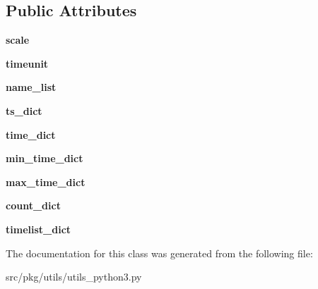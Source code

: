 \subsection*{Public Attributes}
\begin{DoxyCompactItemize}
\item 
\mbox{\label{classrnb-planning_1_1src_1_1pkg_1_1utils_1_1utils__python3_1_1_global_timer_a4f6a8a3fa0f9b2e31e3b1055d60afb4d}} 
{\bfseries scale}
\item 
\mbox{\label{classrnb-planning_1_1src_1_1pkg_1_1utils_1_1utils__python3_1_1_global_timer_af40f7c1aeea5c43d800028ba79819d70}} 
{\bfseries timeunit}
\item 
\mbox{\label{classrnb-planning_1_1src_1_1pkg_1_1utils_1_1utils__python3_1_1_global_timer_a430bc0959a9a9a6ff9e13a1a423c6fda}} 
{\bfseries name\+\_\+list}
\item 
\mbox{\label{classrnb-planning_1_1src_1_1pkg_1_1utils_1_1utils__python3_1_1_global_timer_a87d86cd0930b5243b00adfd9d4e30a11}} 
{\bfseries ts\+\_\+dict}
\item 
\mbox{\label{classrnb-planning_1_1src_1_1pkg_1_1utils_1_1utils__python3_1_1_global_timer_ad6437ef69767faf2aab38f0c9018226d}} 
{\bfseries time\+\_\+dict}
\item 
\mbox{\label{classrnb-planning_1_1src_1_1pkg_1_1utils_1_1utils__python3_1_1_global_timer_a67e7f2ee1e237c26ad7a08adbc37ab19}} 
{\bfseries min\+\_\+time\+\_\+dict}
\item 
\mbox{\label{classrnb-planning_1_1src_1_1pkg_1_1utils_1_1utils__python3_1_1_global_timer_a909f59b75b1b09b6903a6afdce2181ec}} 
{\bfseries max\+\_\+time\+\_\+dict}
\item 
\mbox{\label{classrnb-planning_1_1src_1_1pkg_1_1utils_1_1utils__python3_1_1_global_timer_a0e5c7a0e43d7f758e4e1e8c4af163a42}} 
{\bfseries count\+\_\+dict}
\item 
\mbox{\label{classrnb-planning_1_1src_1_1pkg_1_1utils_1_1utils__python3_1_1_global_timer_a35687c24674794c7c6a8a79ae6ae7fce}} 
{\bfseries timelist\+\_\+dict}
\end{DoxyCompactItemize}


The documentation for this class was generated from the following file\+:\begin{DoxyCompactItemize}
\item 
src/pkg/utils/utils\+\_\+python3.\+py\end{DoxyCompactItemize}
